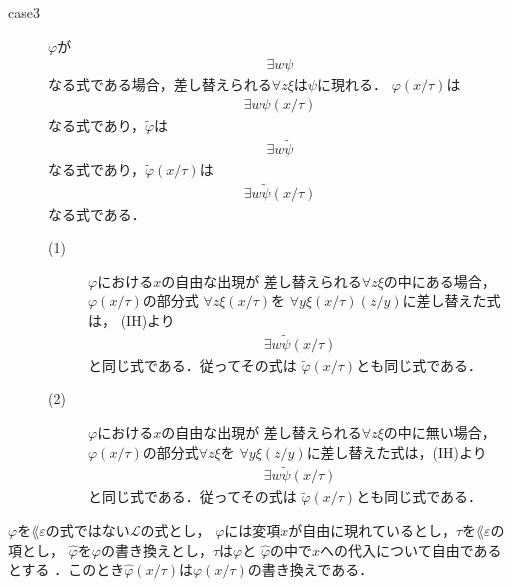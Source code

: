 \begin{metaprf}
\begin{description}
\begin{description}
					\item[case3] $\varphi$が
						\begin{align}
							\exists w \psi
						\end{align}
						なる式である場合，差し替えられる$\forall z \xi$は$\psi$に現れる．
						$\varphi(x/\tau)$は
						\begin{align}
							\exists w \psi(x/\tau)
						\end{align}
						なる式であり，$\widetilde{\varphi}$は
						\begin{align}
							\exists w \widetilde{\psi}
						\end{align}
						なる式であり，$\widetilde{\varphi}(x/\tau)$は
						\begin{align}
							\exists w \widetilde{\psi}(x/\tau)
						\end{align}
						なる式である．
						\begin{description}
							\item[(1)] $\varphi$における$x$の自由な出現が
								差し替えられる$\forall z \xi$の中にある場合，
								$\varphi(x/\tau)$の部分式
								$\forall z \xi(x/\tau)$を
								$\forall y \xi(x/\tau)(z/y)$に差し替えた式は，
								(IH)より
								\begin{align}
									\exists w \widetilde{\psi}(x/\tau)
								\end{align}
								と同じ式である．従ってその式は
								$\widetilde{\varphi}(x/\tau)$とも同じ式である．
								
							\item[(2)] $\varphi$における$x$の自由な出現が
								差し替えられる$\forall z \xi$の中に無い場合，
								$\varphi(x/\tau)$の部分式$\forall z \xi$を
								$\forall y \xi(z/y)$に差し替えた式は，(IH)より
								\begin{align}
									\exists w \widetilde{\psi}(x/\tau)
								\end{align}
								と同じ式である．従ってその式は
								$\widetilde{\varphi}(x/\tau)$とも同じ式である．
								\QED
						\end{description}
				\end{description}
		\end{description}
	\end{metaprf}
	
	
	\begin{screen}
		\begin{metathm}[書き換えへの代入は代入した式の書き換え]
		\label{metathm:substitution_to_rewritten_formula}
			$\varphi$を$\lang{\varepsilon}$の式ではない$\mathcal{L}$の式とし，
			$\varphi$には変項$x$が自由に現れているとし，$\tau$を$\lang{\varepsilon}$の項とし，
			$\widehat{\varphi}$を$\varphi$の書き換えとし，$\tau$は$\varphi$と
			$\widehat{\varphi}$の中で$x$への代入について自由であるとする\footnotemark
			．このとき$\widehat{\varphi}(x/\tau)$は$\varphi(x/\tau)$の書き換えである．
		\end{metathm}
	\end{screen}
	
